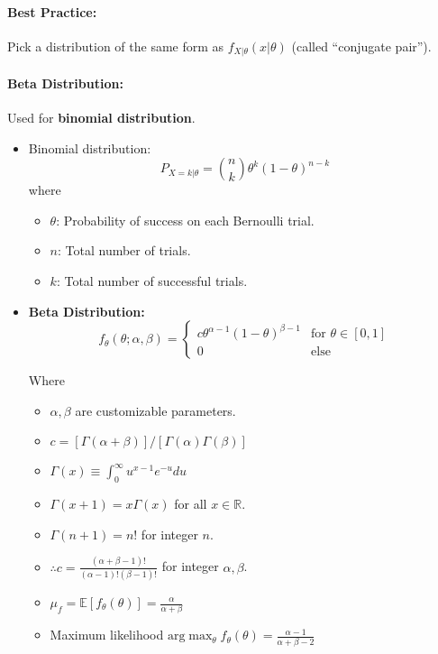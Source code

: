 \documentclass[a4paper,12pt]{report}
\begin{document}
\paragraph{Best Practice: } Pick a distribution of the same form as $f_{X|\theta}(x|\theta)$ (called ``conjugate pair'').

\paragraph{Beta Distribution: } Used for \textbf{binomial distribution}.
\begin{itemize}
\item Binomial distribution: 
\begin{equation}
P_{X = k | \theta} = {n\choose k} \theta^k(1-\theta)^{n-k}
\end{equation}
where 
\begin{itemize}
\item $\theta$: Probability of success on each Bernoulli trial.
\item $n$: Total number of trials.
\item $k$: Total number of successful trials.
\end{itemize}
\item \textbf{Beta Distribution: } 
\begin{equation}
f_\theta(\theta; \alpha, \beta) = \begin{cases}
c\theta^{\alpha-1}(1-\theta)^{\beta-1} & \text{for } \theta\in [0,1] \\
0 & \text{else}
\end{cases}
\end{equation}

Where
\begin{itemize}
\item $\alpha, \beta$ are customizable parameters.
\item $c = [\Gamma(\alpha + \beta)]/[\Gamma(\alpha)\Gamma(\beta)]$
\item $\Gamma(x) \equiv \int_{0}^{\infty} u^{x-1}e^{-u} du$
\item $\Gamma(x+1) = x\Gamma(x)$ for all $x\in \mathbb R$.
\item $\Gamma(n+1) = n!$ for integer $n$.
\item $\therefore c = \frac{(\alpha+\beta-1)!}{(\alpha-1)!(\beta-1)!}$ for integer $\alpha, \beta$.
\item $\mu_f = \mathbb E[f_\theta(\theta)] = \frac{\alpha}{\alpha + \beta}$
\item Maximum likelihood $\text{arg}\max_\theta f_\theta(\theta) = \frac{\alpha-1}{\alpha+\beta-2}$
\end{itemize}
\end{itemize}
\end{document}
